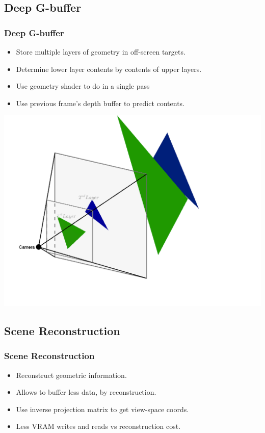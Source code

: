 \documentclass{beamer}
\begin{document}

\subsection{Deep G-buffer} 

\begin{frame}
\frametitle{Deep G-buffer}
\begin{itemize}
\item Store multiple layers of geometry in off-screen targets.
\item Determine lower layer contents by contents of upper layers.
\item Use geometry shader to do in a single pass
\item Use previous frame's depth buffer to predict contents.
\end{itemize}

\begin{center}
\includegraphics[scale=0.8]{img/2-layer}
\end{center}
\end{frame}


\subsection{Scene Reconstruction}

\begin{frame}
\frametitle{Scene Reconstruction}
\begin{itemize}
\item Reconstruct geometric information.
\item Allows to buffer less data, by reconstruction.
\item Use inverse projection matrix to get view-space coords.
\item Less VRAM writes and reads vs reconstruction cost.
\end{itemize}
\end{frame}
\end{document}
